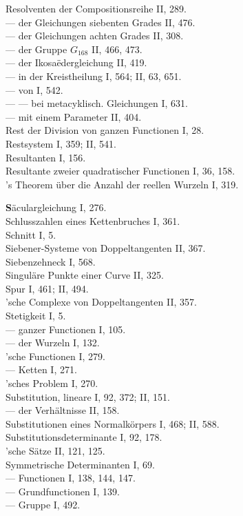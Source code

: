Resolventen der Compositionsreihe II, 289.\\
--- der Gleichungen siebenten Grades II, 476.\\
--- der Gleichungen achten Grades II, 308.\\
--- der Gruppe $G_{168}$ II, 466, 473.\\
--- der Ikosa\"edergleichung II, 419.\\
--- in der Kreistheilung I, 564; II, 63, 651.\\
--- von  I, 542.\\
--- --- bei metacyklisch. Gleichungen I, 631.\\
--- mit einem Parameter II, 404.\\
Rest der Division von ganzen Functionen I, 28.\\
Restsystem I, 359; II, 541.\\
Resultanten I, 156.\\
Resultante zweier quadratischer Functionen I, 36, 158.\\
's Theorem über die Anzahl der reellen Wurzeln I, 319.

\medskip
\noindent
\textbf{S}äculargleichung I, 276.\\
Schlusszahlen eines Kettenbruches I, 361.\\
Schnitt I, 5.\\
Siebener-Systeme von Doppeltangenten II, 367.\\
Siebenzehneck I, 568.\\
Singuläre Punkte einer Curve II, 325.\\
Spur I, 461; II, 494.\\
'sche Complexe von Doppeltangenten II, 357.\\
Stetigkeit I, 5.\\
--- ganzer Functionen I, 105.\\
--- der Wurzeln I, 132.\\
'sche Functionen I, 279.\\
--- Ketten I, 271.\\
'sches Problem I, 270.\\
Substitution, lineare I, 92, 372; II, 151.\\
--- der Verhältnisse II, 158.\\
Substitutionen eines Normalkörpers I, 468; II, 588.\\
Substitutionsdeterminante I, 92, 178.\\
'sche Sätze II, 121, 125.\\
Symmetrische Determinanten I, 69.\\
--- Functionen I, 138, 144, 147.\\
--- Grundfunctionen I, 139.\\
--- Gruppe I, 492.
